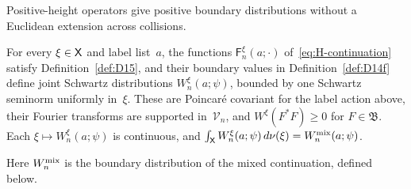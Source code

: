 Positive-height operators give positive boundary distributions without a Euclidean extension across collisions.
\begin{lemma}\label{lem:H2.1}
For every $\xi\in\mathsf{X}$ and label list~$a$, the functions $\mathsf F^\xi_n(a;\cdot)$ of~\eqref{eq:H-continuation} satisfy Definition~\ref{def:D15}, and their boundary values in Definition~\ref{def:D14f} define joint Schwartz distributions $W^\xi_n(a;\psi)$, bounded by one Schwartz seminorm uniformly in~$\xi$. These are Poincar\'e covariant for the label action above, their Fourier transforms are supported in~$\mathcal V_n$, and $W^\xi(F^*F)\ge0$ for $F\in\mathfrak B$. Each $\xi\mapsto W^\xi_n(a;\psi)$ is continuous, and $\int_{\mathsf{X}}W^\xi_n(a;\psi)\,d\nu(\xi)=W^{\rm mix}_n(a;\psi)$.
\end{lemma}
Here $W^{\rm mix}_n$ is the boundary distribution of the mixed continuation, defined below.
